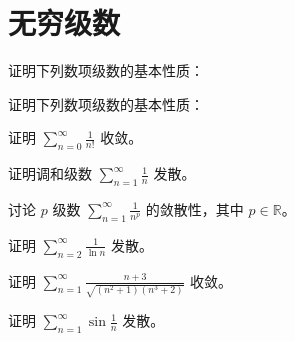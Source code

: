 \renewcommand{\thesection}{\arabic{section}}\renewcommand{\theHsection}{chapter.\arabic{section}}\setcounter{section}{6}\section{无穷级数}
\noindent\begin{minipage}{\textwidth}
证明下列数项级数的基本性质：
\end{minipage}\par\vfill
\noindent\begin{minipage}{\textwidth}
证明下列数项级数的基本性质：
\end{minipage}\par\vfill
\noindent\begin{minipage}{\textwidth}
证明 $\displaystyle\sum_{n=0}^{\infty}\frac1{n!}$ 收敛。
\end{minipage}\par\vfill
\noindent\begin{minipage}{\textwidth}
证明调和级数 $\displaystyle\sum_{n=1}^{\infty}\frac1n$ 发散。
\end{minipage}\par\vfill
\newpage
\noindent\begin{minipage}{\textwidth}
讨论 $p$ 级数 $\displaystyle\sum_{n=1}^{\infty}\frac1{n^p}$ 的敛散性，其中 $p\in\mathbb R$。
\end{minipage}\par\vfill
\noindent\begin{minipage}{\textwidth}
证明 $\displaystyle\sum_{n=2}^{\infty}\frac1{\ln n}$ 发散。
\end{minipage}\par\vfill
\noindent\begin{minipage}{\textwidth}
证明 $\displaystyle\sum_{n=1}^{\infty}\frac{n+3}{\sqrt{(n^2+1)(n^3+2)}}$ 收敛。
\end{minipage}\par\vfill
\noindent\begin{minipage}{\textwidth}
证明 $\displaystyle\sum_{n=1}^{\infty}\sin\frac1n$ 发散。
\end{minipage}\par\vfill
